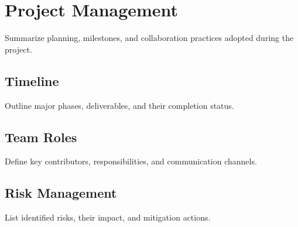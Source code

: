 \section{Project Management}

Summarize planning, milestones, and collaboration practices adopted during the project.

\subsection{Timeline}
Outline major phases, deliverables, and their completion status.

\subsection{Team Roles}
Define key contributors, responsibilities, and communication channels.

\subsection{Risk Management}
List identified risks, their impact, and mitigation actions.
